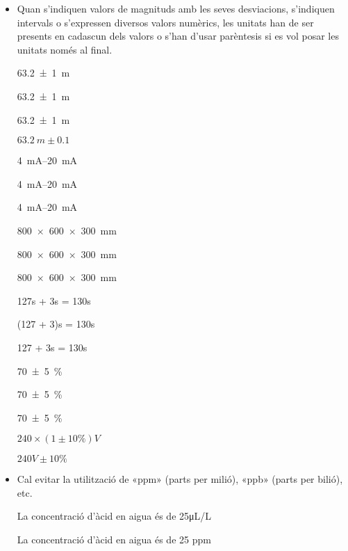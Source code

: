 \begin{itemize}

\item Quan s'indiquen valors de magnituds amb les seves desviacions,
s'indiquen intervals o s'expressen diversos valors numèrics, les
unitats han de ser presents en cadascun dels valors o s'han d'usar
parèntesis si es vol posar les unitats només al final.

\textcolor{Green}\faCheckSquare{} \SI[separate-uncertainty, multi-part-units = repeat]{63,2(1)}{m}

\textcolor{Green}\faCheckSquare{} \SI[separate-uncertainty]{63,2(1)}{m}

\textcolor{Red}\faTimesCircle{} \SI[separate-uncertainty, multi-part-units = single]{63,2(1)}{m}

\textcolor{Red}\faTimesCircle{}  $\SI{63,2}{m} \pm \num{0,1}$


\textcolor{Green}\faCheckSquare{} \SIrange{4}{20}{mA}

\textcolor{Green}\faCheckSquare{} \SIrange[range-units = brackets]{4}{20}{mA}

\textcolor{Red}\faTimesCircle{} \SIrange[range-units = single]{4}{20}{mA}


\textcolor{Green}\faCheckSquare{} \SI{800 x 600 x 300}{mm}

\textcolor{Green}\faCheckSquare{} \SI[product-units = brackets]{800 x 600 x 300}{mm}

\textcolor{Red}\faTimesCircle{} \SI[product-units = single]{800 x 600 x 300}{mm}


\textcolor{Green}\faCheckSquare{} 127\unit{s} + 3\unit{s} = 130\unit{s}

\textcolor{Green}\faCheckSquare{}  (127 + 3)\unit{s} = 130\unit{s}

\textcolor{Red}\faTimesCircle{}  127 + 3\unit{s} = 130\unit{s}


\textcolor{Green}\faCheckSquare{} \SI[separate-uncertainty, multi-part-units = repeat]{70(5)}{\%}

\textcolor{Green}\faCheckSquare{} \SI[separate-uncertainty]{70(5)}{\%}

\textcolor{Red}\faTimesCircle{} \SI[separate-uncertainty, multi-part-units = single]{70(5)}{\%}


\textcolor{Green}\faCheckSquare{} $240 \times (1 \pm 10\unit{\%})\unit{V}$

\textcolor{Red}\faTimesCircle{}  $240\unit{V} \pm 10\unit{\%}$


\item Cal evitar la utilització de «ppm» (parts per milió), «ppb» (parts per bilió), etc.

\textcolor{Green}\faCheckSquare{} La concentració d'àcid en aigua és de 25\unit{\micro L/L}

\textcolor{Red}\faTimesCircle{} La concentració d'àcid en aigua és de 25 ppm

\end{itemize}



